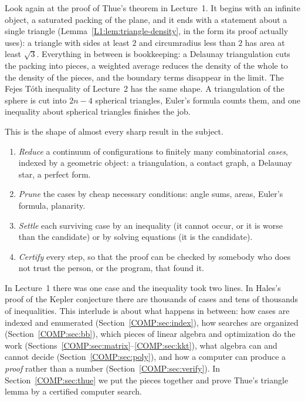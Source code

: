 \documentclass[11pt,openany]{book}
\theoremstyle{plain}
\theoremstyle{definition}
\theoremstyle{remark}
\begin{document}
Look again at the proof of Thue's theorem in Lecture~1. It begins with an infinite object, a
saturated packing of the plane, and it ends with a statement about a single triangle
(Lemma~\ref{L1:lem:triangle-density}, in the form its proof actually uses): a triangle with sides at
least $2$ and circumradius less than $2$ has area at least $\sqrt3$. Everything in between is bookkeeping: a Delaunay triangulation cuts the
packing into pieces, a weighted average reduces the density of the whole to the density of the pieces,
and the boundary terms disappear in the limit. The Fejes T\'oth inequality of Lecture~2 has the same
shape. A triangulation of the sphere is cut into $2n-4$ spherical triangles, Euler's formula counts
them, and one inequality about spherical triangles finishes the job.

This is the shape of almost every sharp result in the subject.
\begin{enumerate}[label=(\arabic*)]
\item \emph{Reduce} a continuum of configurations to finitely many combinatorial \emph{cases}, indexed by
  a geometric object: a triangulation, a contact graph, a Delaunay star, a perfect form.
\item \emph{Prune} the cases by cheap necessary conditions: angle sums, areas, Euler's formula, planarity.
\item \emph{Settle} each surviving case by an inequality (it cannot occur, or it is worse than the
  candidate) or by solving equations (it is the candidate).
\item \emph{Certify} every step, so that the proof can be checked by somebody who does not trust the
  person, or the program, that found it.
\end{enumerate}
In Lecture~1 there was one case and the inequality took two lines. In Hales's proof of the Kepler
conjecture there are thousands of cases and tens of thousands of inequalities. This interlude is about
what happens in between: how cases are indexed and enumerated (Section~\ref{COMP:sec:index}), how
searches are organized (Section~\ref{COMP:sec:bb}), which pieces of linear algebra and optimization do
the work (Sections~\ref{COMP:sec:matrix}--\ref{COMP:sec:kkt}), what algebra can and cannot decide
(Section~\ref{COMP:sec:poly}), and how a computer can produce a \emph{proof} rather than a number
(Section~\ref{COMP:sec:verify}). In Section~\ref{COMP:sec:thue} we put the pieces together and prove
Thue's triangle lemma by a certified computer search.

\end{document}
